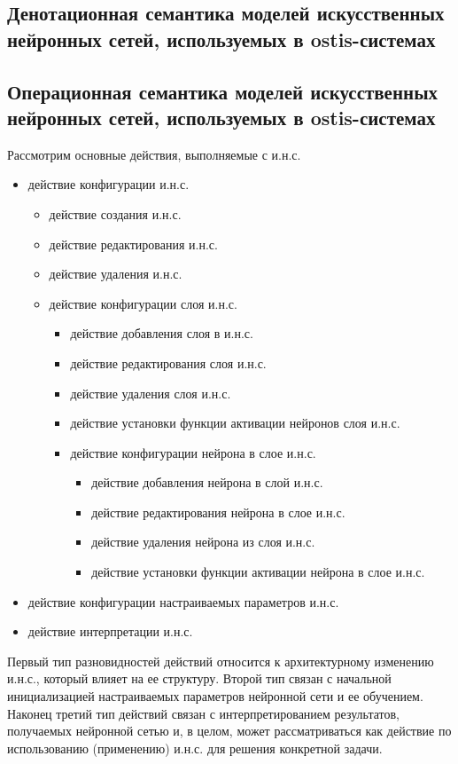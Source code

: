 \subsection{Денотационная семантика моделей искусственных нейронных сетей, используемых в ostis-системах}

\subsection{Операционная семантика моделей искусственных нейронных сетей, используемых в ostis-системах}

Рассмотрим основные действия, выполняемые с и.н.с.

\begin{itemize}
	\item действие конфигурации и.н.с.
	\begin{itemize}
		\item действие создания и.н.с.
		\item действие редактирования и.н.с.
		\item действие удаления и.н.с.
		\item действие конфигурации слоя и.н.с.
		\begin{itemize}
			\item действие добавления слоя в и.н.с.
			\item действие редактирования слоя и.н.с.
			\item действие удаления слоя и.н.с.
			\item действие установки функции активации нейронов слоя и.н.с.
			\item действие конфигурации нейрона в слое и.н.с.
			\begin{itemize}
				\item действие добавления нейрона в слой и.н.с.
				\item действие редактирования нейрона в слое и.н.с.
				\item действие удаления нейрона из слоя и.н.с.
				\item действие установки функции активации нейрона в слое и.н.с.
			\end{itemize}
		\end{itemize}
	\end{itemize}
	\item действие конфигурации настраиваемых параметров и.н.с.
	\item действие интерпретации и.н.с.
\end{itemize}

Первый тип разновидностей действий относится к архитектурному изменению и.н.с., который влияет на ее структуру. Второй тип связан с начальной инициализацией настраиваемых параметров нейронной сети и ее обучением. Наконец третий тип действий связан с интерпретированием результатов, получаемых нейронной сетью и, в целом, может рассматриваться как действие по использованию (применению) и.н.с. для решения конкретной задачи.

